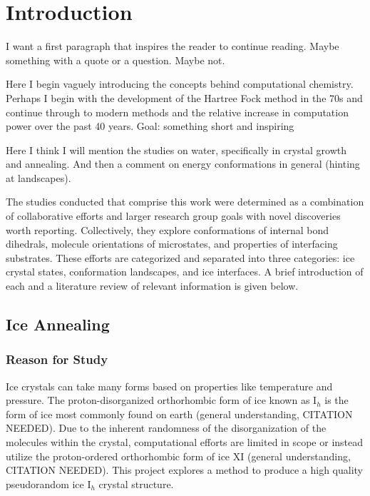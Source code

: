 \chapter{Introduction}
\label{ch:Introduction}

I want a first paragraph that inspires the reader to continue reading. Maybe something with a quote or a question. Maybe not.

Here I begin vaguely introducing the concepts behind computational chemistry. 
Perhaps I begin with the development of the Hartree Fock method in the 70s and continue through to modern methods and the relative increase in computation power over the past 40 years. 
Goal: something short and inspiring

Here I think I will mention the studies on water, specifically in crystal growth and annealing. And then a comment on energy conformations in general (hinting at landscapes).



The studies conducted that comprise this work were determined as a combination of collaborative efforts and larger research group goals with novel discoveries worth reporting.
Collectively, they explore conformations of internal bond dihedrals, molecule orientations of microstates, and properties of interfacing substrates.
These efforts are categorized and separated into three categories: ice crystal states, conformation landscapes, and ice interfaces. 
A brief introduction of each and a literature review of relevant information is given below.

\section{Ice Annealing}

\subsection{Reason for Study}

Ice crystals can take many forms based on properties like temperature and pressure. 
The proton-disorganized orthorhombic form of ice known as I$_{h}$ is the form of ice most commonly found on earth (general understanding, CITATION NEEDED). 
Due to the inherent randomness of the disorganization of the molecules within the crystal, computational efforts are limited in scope or instead utilize the proton-ordered orthorhombic form of ice XI  (general understanding, CITATION NEEDED).
This project explores a method to produce a high quality pseudorandom ice I$_{h}$ crystal structure.

